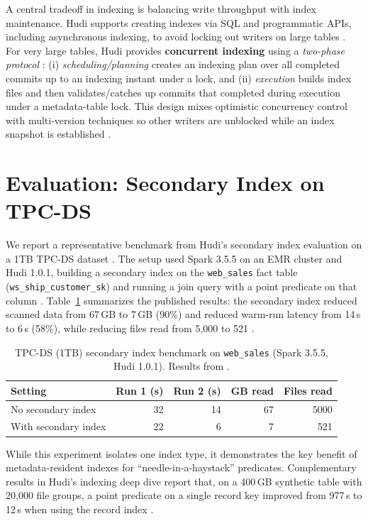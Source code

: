 \documentclass[sigconf]{acmart}
\begin{document}
A central tradeoff in indexing is balancing write throughput with index maintenance.
Hudi supports creating indexes via SQL and programmatic APIs, including asynchronous indexing, to avoid locking out writers on large tables \cite{hudi-indexing}.
For very large tables, Hudi provides \textbf{concurrent indexing} using a \emph{two-phase protocol} \cite{hudi-indexing}:
(i) \emph{scheduling/planning} creates an indexing plan over all completed commits up to an indexing instant under a lock, and
(ii) \emph{execution} builds index files and then validates/catches up commits that completed during execution under a metadata-table lock.
This design mixes optimistic concurrency control with multi-version techniques so other writers are unblocked while an index snapshot is established \cite{hudi-indexing}.

\section{Evaluation: Secondary Index on TPC-DS}

We report a representative benchmark from Hudi's secondary index evaluation on a 1TB TPC-DS dataset \cite{hudi-secondary-index-blog}.
The setup used Spark 3.5.5 on an EMR cluster and Hudi 1.0.1, building a secondary index on the \texttt{web\_sales} fact table (\texttt{ws\_ship\_customer\_sk}) and running a join query with a point predicate on that column \cite{hudi-secondary-index-blog}.
Table~\ref{tab:tpcds} summarizes the published results: the secondary index reduced scanned data from 67\,GB to 7\,GB (90\%) and reduced warm-run latency from 14\,s to 6\,s (58\%), while reducing files read from 5{,}000 to 521 \cite{hudi-secondary-index-blog}.

\begin{table}[t]
\caption{TPC-DS (1TB) secondary index benchmark on \texttt{web\_sales} (Spark 3.5.5, Hudi 1.0.1). Results from \cite{hudi-secondary-index-blog}.}
\label{tab:tpcds}
\centering
\small
\begin{tabular}{@{}lrrrr@{}}
\toprule
\textbf{Setting} & \textbf{Run 1 (s)} & \textbf{Run 2 (s)} & \textbf{GB read} & \textbf{Files read} \\
\midrule
No secondary index & 32 & 14 & 67 & 5000 \\
With secondary index & 22 & 6 & 7 & 521 \\
\bottomrule
\end{tabular}
\end{table}

While this experiment isolates one index type, it demonstrates the key benefit of metadata-resident indexes for ``needle-in-a-haystack'' predicates.
Complementary results in Hudi's indexing deep dive report that, on a 400\,GB synthetic table with 20{,}000 file groups, a point predicate on a single record key improved from 977\,s to 12\,s when using the record index \cite{hudi-indexing-deep-dive-part2}.
\end{document}
